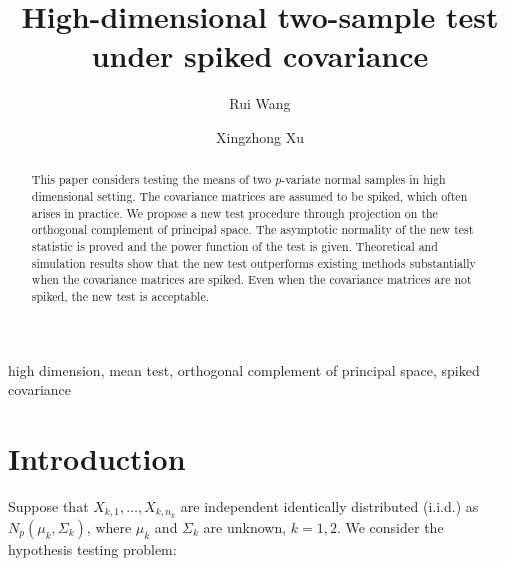 \documentclass[review]{elsarticle}
\theoremstyle{plain}
\theoremstyle{definition}
\theoremstyle{remark}
\begin{document}
\begin{frontmatter}

\title{High-dimensional two-sample test under spiked covariance}

    \author[mymainaddress]{Rui Wang}
    \author[mymainaddress,mysecondaryaddress]{Xingzhong Xu}
    \address[mymainaddress]{School of Mathematics and Statistics, Beijing Institute of Technology, Beijing 
    100081,China}
    \address[mysecondaryaddress]{Beijing Key Laboratory on MCAACI, Beijing Institute of Technology, Beijing 100081,China}




\begin{abstract}
    This paper considers testing the means of two $p$-variate normal samples in high dimensional setting.  The covariance matrices are assumed to be spiked, which often arises in practice. 
    We propose a new test procedure through projection on the orthogonal complement of principal space.
    The asymptotic normality of the new test statistic is proved and the power function of the test is given.
    Theoretical and simulation results show that the new test outperforms existing methods substantially when the covariance matrices are spiked. Even when the covariance matrices are not spiked, the new test is acceptable.
\end{abstract}

\begin{keyword}
    high dimension, mean test, orthogonal complement of principal space, spiked covariance
\end{keyword}

\end{frontmatter}




\section{Introduction}

Suppose that $X_{k,1},\ldots,X_{k,n_k}$  are independent identically distributed (i.i.d.) as $N_p(\mu_k,\Sigma_k)$, where $\mu_k$ and $\Sigma_k$ are unknown, $k=1,2$. We consider the hypothesis testing problem:
\end{document}
